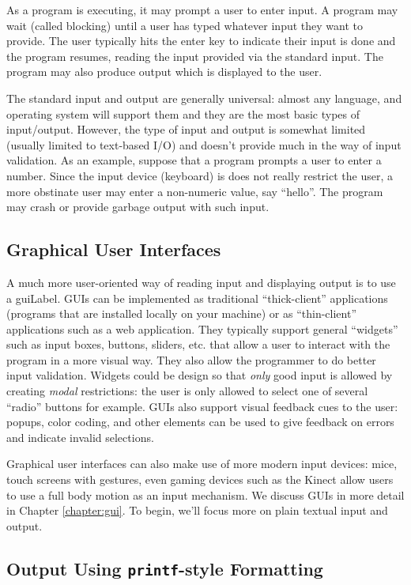 As a program is executing, it may prompt a user to enter input.  A program
may wait (called blocking) until a user has typed whatever input they want to provide.
The user typically hits the enter key to indicate their input is done and the 
program resumes, reading the input provided via the standard input.  The
program may also produce output which is displayed to the user.

The standard input and output are generally universal: almost any language, 
and operating system will support them and they are the most basic types
of input/output.  However, the type of input and output is somewhat limited (usually limited
to text-based I/O) and doesn't provide much in the way of input \gls{validation}.
As an example, suppose that a program prompts a user to enter a number.  
Since the input device (keyboard) is does not really restrict the user, a more
obstinate user may enter a non-numeric value, say ``hello''.  The program
may crash or provide garbage output with such input.  

\subsection{Graphical User Interfaces}

A much more user-oriented way of reading input and displaying output is to use
a \gls{guiLabel}.  GUIs can be implemented as traditional ``thick-client'' applications
(programs that are installed locally on your machine) or as ``thin-client'' applications
such as a web application.  They typically support general ``widgets'' such as input
boxes, buttons, sliders, etc. that allow a user to interact with the program in a 
more visual way.  They also allow the programmer to do better input validation.  
Widgets could be design so that \emph{only} good input is allowed by creating
\emph{modal} restrictions: the user is only allowed to select one of several ``radio''
buttons for example.  GUIs also support visual feedback cues to the user: popups,
color coding, and other elements can be used to give feedback on errors and
indicate invalid selections.  

Graphical user interfaces can also make use of more modern input devices: mice, touch 
screens with gestures, even gaming devices such as the Kinect allow users to use
a full body motion as an input mechanism.  We discuss GUIs in more detail in 
Chapter \ref{chapter:gui}.  To begin, we'll focus more on plain textual input and output.

\subsection{Output Using \texttt{printf}-style Formatting}
\label{subsection:printfStyleFormatting}

